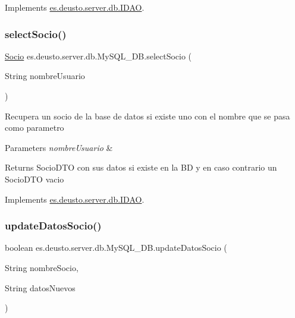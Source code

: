 Implements \mbox{\hyperlink{interfacees_1_1deusto_1_1server_1_1db_1_1_i_d_a_o_ab8723905772b63f54902859f45bd121b}{es.\+deusto.\+server.\+db.\+I\+D\+AO}}.

\mbox{\label{classes_1_1deusto_1_1server_1_1db_1_1_my_s_q_l___d_b_a36eec47b7d590c9dd37aec41af2033db}} 
\subsubsection{\texorpdfstring{selectSocio()}{selectSocio()}}
{\footnotesize\ttfamily \mbox{\hyperlink{classes_1_1deusto_1_1client_1_1data_1_1_socio}{Socio}} es.\+deusto.\+server.\+db.\+My\+S\+Q\+L\+\_\+\+D\+B.\+select\+Socio (\begin{DoxyParamCaption}\item[{String}]{nombre\+Usuario }\end{DoxyParamCaption})}

Recupera un socio de la base de datos si existe uno con el nombre que se pasa como parametro 
\begin{DoxyParams}{Parameters}
{\em nombre\+Usuario} & \\
\hline
\end{DoxyParams}
\begin{DoxyReturn}{Returns}
Socio\+D\+TO con sus datos si existe en la BD y en caso contrario un Socio\+D\+TO vacio 
\end{DoxyReturn}


Implements \mbox{\hyperlink{interfacees_1_1deusto_1_1server_1_1db_1_1_i_d_a_o_ab8bc0f83a9306dbd0f98601420cac890}{es.\+deusto.\+server.\+db.\+I\+D\+AO}}.

\mbox{\label{classes_1_1deusto_1_1server_1_1db_1_1_my_s_q_l___d_b_aa2865a9bd2ac6181664979c3a61615e1}} 
\subsubsection{\texorpdfstring{updateDatosSocio()}{updateDatosSocio()}}
{\footnotesize\ttfamily boolean es.\+deusto.\+server.\+db.\+My\+S\+Q\+L\+\_\+\+D\+B.\+update\+Datos\+Socio (\begin{DoxyParamCaption}\item[{String}]{nombre\+Socio,  }\item[{String}]{datos\+Nuevos }\end{DoxyParamCaption})}


